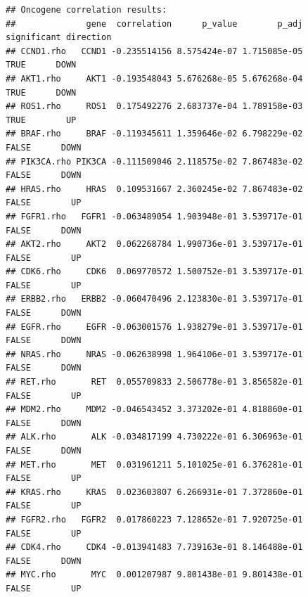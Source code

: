 \documentclass[
]{article}
\begin{document}
\begin{verbatim}
## Oncogene correlation results:
##              gene  correlation      p_value        p_adj significant direction
## CCND1.rho   CCND1 -0.235514156 8.575424e-07 1.715085e-05        TRUE      DOWN
## AKT1.rho     AKT1 -0.193548043 5.676268e-05 5.676268e-04        TRUE      DOWN
## ROS1.rho     ROS1  0.175492276 2.683737e-04 1.789158e-03        TRUE        UP
## BRAF.rho     BRAF -0.119345611 1.359646e-02 6.798229e-02       FALSE      DOWN
## PIK3CA.rho PIK3CA -0.111509046 2.118575e-02 7.867483e-02       FALSE      DOWN
## HRAS.rho     HRAS  0.109531667 2.360245e-02 7.867483e-02       FALSE        UP
## FGFR1.rho   FGFR1 -0.063489054 1.903948e-01 3.539717e-01       FALSE      DOWN
## AKT2.rho     AKT2  0.062268784 1.990736e-01 3.539717e-01       FALSE        UP
## CDK6.rho     CDK6  0.069770572 1.500752e-01 3.539717e-01       FALSE        UP
## ERBB2.rho   ERBB2 -0.060470496 2.123830e-01 3.539717e-01       FALSE      DOWN
## EGFR.rho     EGFR -0.063001576 1.938279e-01 3.539717e-01       FALSE      DOWN
## NRAS.rho     NRAS -0.062638998 1.964106e-01 3.539717e-01       FALSE      DOWN
## RET.rho       RET  0.055709833 2.506778e-01 3.856582e-01       FALSE        UP
## MDM2.rho     MDM2 -0.046543452 3.373202e-01 4.818860e-01       FALSE      DOWN
## ALK.rho       ALK -0.034817199 4.730222e-01 6.306963e-01       FALSE      DOWN
## MET.rho       MET  0.031961211 5.101025e-01 6.376281e-01       FALSE        UP
## KRAS.rho     KRAS  0.023603807 6.266931e-01 7.372860e-01       FALSE        UP
## FGFR2.rho   FGFR2  0.017860223 7.128652e-01 7.920725e-01       FALSE        UP
## CDK4.rho     CDK4 -0.013941483 7.739163e-01 8.146488e-01       FALSE      DOWN
## MYC.rho       MYC  0.001207987 9.801438e-01 9.801438e-01       FALSE        UP
\end{verbatim}
\end{document}
